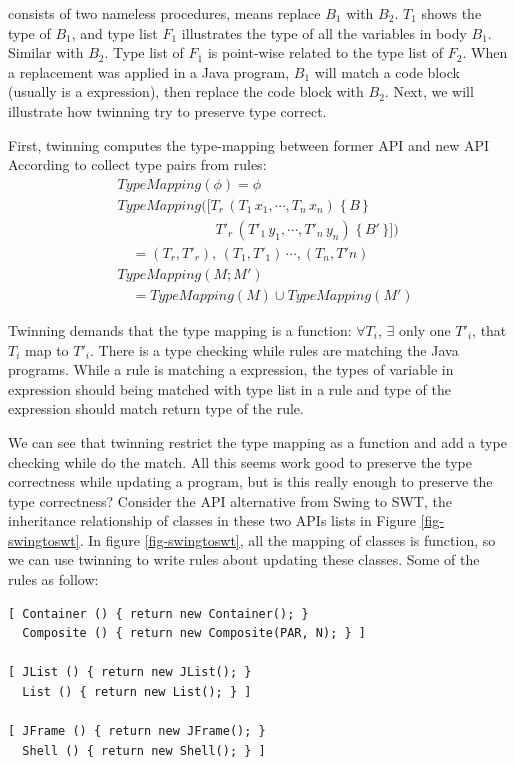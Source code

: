 \noindent consists of two nameless procedures, means replace $B_{1}$ with 
$B_{2}$. 
$T_{1}$ shows the type of $B_{1}$, and type list $F_{1}$ illustrates the
type of all the variables in body $B_{1}$. Similar with $B_{2}$. 
Type list of $F_{1}$ is point-wise related to the type list of
$F_{2}$. When a replacement was applied in a Java program, $B_{1}$ will match a code block 
(usually is a expression), then replace the code block with $B_{2}$.
Next, we will illustrate how twinning try to preserve type correct.


First, twinning computes the type-mapping between former API and new API
According to collect type pairs from rules:
\begin{align*}
    &TypeMapping(\phi) = \phi \\
    &TypeMapping([T_{r}\,(T_{1}\,x_{1},\cdots,T_{n}\,x_{n})\; \{\,B\,\} \\
    &\quad\quad\quad\quad\quad\quad\quad T'_{r}\,(T'_{1}\,y_{1},\cdots,T'_{n}\,y_{n})\; \{\,B'\,\}]) \\
    &\quad={(T_{r},T'_{r}),\,(T_{1},T'_{1})\,\cdots,(T_{n}, T'{n})}\\
    &TypeMapping(M;M')\\
    &\quad =TypeMapping(M)\cup TypeMapping(M')
\end{align*}

Twinning demands that the type mapping is a function: $\forall T_{i}$, $\exists$ 
only one $T'_{i}$, that $T_{i}$ map to $T'_{i}$. 
There is a type checking while rules are matching the Java programs.
While a rule is matching a expression,
the types of variable in expression should being matched with type list in a rule
and type of the expression should match return type of the rule. 

We can see that twinning restrict the type mapping as a function and add a type checking while do
the match.
All this seems work good to preserve the type correctness while updating a program, 
but is this really enough to
preserve the type correctness?
Consider the API alternative from Swing to SWT, the inheritance relationship of classes in these two APIs lists in 
Figure \ref{fig-swingtoswt}. In figure \ref{fig-swingtoswt}, all the
mapping of classes is function, so we can use twinning to write rules about updating these classes. 
Some of the rules as follow:

\begin{verbatim}
[ Container () { return new Container(); }
  Composite () { return new Composite(PAR, N); } ]

[ JList () { return new JList(); } 
  List () { return new List(); } ]

[ JFrame () { return new JFrame(); }
  Shell () { return new Shell(); } ]
\end{verbatim}

